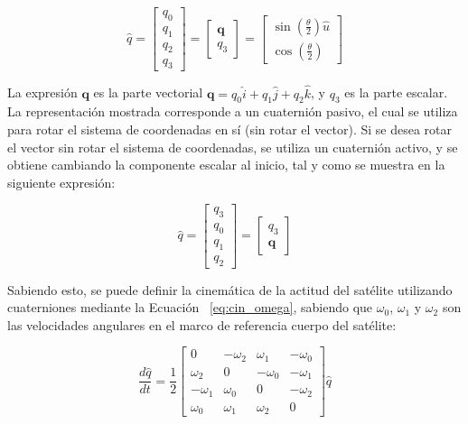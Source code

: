\begin{equation}
	\hat{q} = \begin{bmatrix}
		q_0 \\
		q_1 \\
		q_2 \\
		q_3
	\end{bmatrix}
	= \begin{bmatrix}
		\mathbf{q} \\
		q_3
	\end{bmatrix}
	= \begin{bmatrix}
		\sin\left(\frac{\theta}{2}\right) \hat{u} \\
		\cos\left(\frac{\theta}{2}\right)
	\end{bmatrix}
	\label{eq:cin_quat}
\end{equation}

La expresión \( \mathbf{q} \) es la parte vectorial \( \mathbf{q} = q_0 \hat{i} + q_1 \hat{j} + q_2 \hat{k} \), y \( q_3 \) es la parte escalar. La representación mostrada corresponde a un cuaternión pasivo, el cual se utiliza para rotar el sistema de coordenadas en sí (sin rotar el vector). Si se desea rotar el vector sin rotar el sistema de coordenadas, se utiliza un cuaternión activo, y se obtiene cambiando la componente escalar al inicio, tal y como se muestra en la siguiente expresión:

\[
\hat{q} = \begin{bmatrix}
	q_3 \\
	q_0 \\
	q_1 \\
	q_2
\end{bmatrix}
= \begin{bmatrix}
	q_3 \\
	\mathbf{q}
\end{bmatrix}
\]

Sabiendo esto, se puede definir la cinemática de la actitud del satélite utilizando cuaterniones mediante la Ecuación ~\ref{eq:cin_omega}, sabiendo que \( \omega_0 \), \( \omega_1 \) y \( \omega_2 \) son las velocidades angulares en el marco de referencia cuerpo del satélite:

\begin{equation}
	\frac{d\hat{q}}{dt} = \frac{1}{2}
	\begin{bmatrix}
		0 & -\omega_2 & \omega_1 & -\omega_0 \\
		\omega_2 & 0 & -\omega_0 & -\omega_1 \\
		-\omega_1 & \omega_0 & 0 & -\omega_2 \\
		\omega_0 & \omega_1 & \omega_2 & 0
	\end{bmatrix}
	\hat{q}
	\label{eq:cin_omega}
\end{equation}

